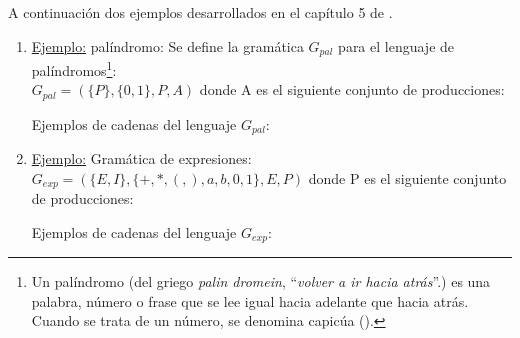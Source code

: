 A continuación dos ejemplos desarrollados en el capítulo 5 de \cite{gramatica}.

\begin{enumerate}
\item \underline{Ejemplo:} palíndromo:
Se define la gramática $G_{pal}$ para el lenguaje de palíndromos\footnote{Un palíndromo (del griego \textit{palin dromein}, ``\textit{volver a ir hacia atrás}''.) es una palabra, número o frase que se lee igual hacia adelante que hacia atrás. Cuando se trata de un número, se denomina capicúa ().}: \\
$G_{pal} = (\{P\},\{0,1\}, P, A)$
donde A es el siguiente conjunto de producciones:

Ejemplos de cadenas del lenguaje $G_{pal}$:

\item \underline{Ejemplo:} Gramática de expresiones:\\
\textbf{$G_{exp} = (\{E,I\}, \{+,*,(,),a,b,0,1\}, E, P)$} donde P es el siguiente conjunto de producciones:

Ejemplos de cadenas del lenguaje $G_{exp}$:

\end{enumerate}

